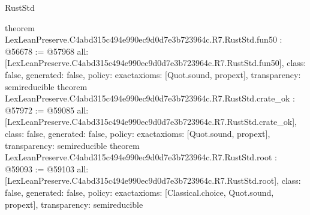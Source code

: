 \begin{lexlean}{RustStd}
\begin{coremodule}
{}
theorem LexLeanPreserve.C4abd315c494e990ec9d0d7e3b723964c.R7.RustStd.fun50 : @56678 := @57968 {
  all: [LexLeanPreserve.C4abd315c494e990ec9d0d7e3b723964c.R7.RustStd.fun50],
  class: false,
  generated: false,
  policy: exact{axioms: [Quot.sound, propext]},
  transparency: semireducible
}
theorem LexLeanPreserve.C4abd315c494e990ec9d0d7e3b723964c.R7.RustStd.crate_ok : @57972 := @59085 {
  all: [LexLeanPreserve.C4abd315c494e990ec9d0d7e3b723964c.R7.RustStd.crate_ok],
  class: false,
  generated: false,
  policy: exact{axioms: [Quot.sound, propext]},
  transparency: semireducible
}
theorem LexLeanPreserve.C4abd315c494e990ec9d0d7e3b723964c.R7.RustStd.root : @59093 := @59103 {
  all: [LexLeanPreserve.C4abd315c494e990ec9d0d7e3b723964c.R7.RustStd.root],
  class: false,
  generated: false,
  policy: exact{axioms: [Classical.choice, Quot.sound, propext]},
  transparency: semireducible
}


\end{coremodule}
\end{lexlean}
